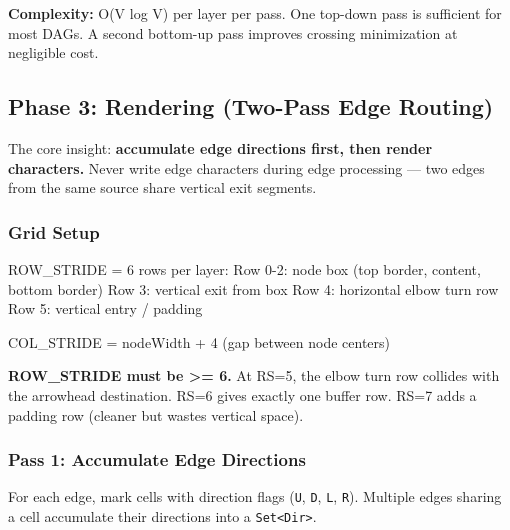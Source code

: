 \textbf{Complexity:} O(V log V) per layer per pass. One top-down pass is sufficient for most DAGs. A second bottom-up pass improves crossing minimization at negligible cost.

\subsection{Phase 3: Rendering (Two-Pass Edge Routing)}\label{record-426-phase-3-rendering-two-pass-edge-routing}

The core insight: \textbf{accumulate edge directions first, then render characters.} Never write edge characters during edge processing --- two edges from the same source share vertical exit segments.

\subsubsection{Grid Setup}\label{record-426-grid-setup}

\begin{CodeBlock}
ROW_STRIDE = 6 rows per layer:
  Row 0-2: node box (top border, content, bottom border)
  Row 3:   vertical exit from box
  Row 4:   horizontal elbow turn row
  Row 5:   vertical entry / padding

COL_STRIDE = nodeWidth + 4 (gap between node centers)
\end{CodeBlock}

\textbf{ROW\_STRIDE must be \textgreater= 6.} At RS=5, the elbow turn row collides with the arrowhead destination. RS=6 gives exactly one buffer row. RS=7 adds a padding row (cleaner but wastes vertical space).

\subsubsection{Pass 1: Accumulate Edge Directions}\label{record-426-pass-1-accumulate-edge-directions}

For each edge, mark cells with direction flags (\texttt{U}, \texttt{D}, \texttt{L}, \texttt{R}). Multiple edges sharing a cell accumulate their directions into a \texttt{S\allowbreak{}e\allowbreak{}t\allowbreak{}<\allowbreak{}D\allowbreak{}i\allowbreak{}r\allowbreak{}>}.

